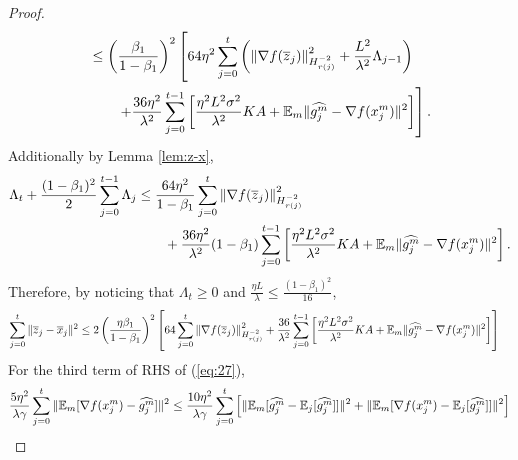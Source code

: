 \documentclass{article} %
\numberwithin{equation}{section}
\renewcommand{\eqref}[1]{(\ref{#1})}
\begin{document}
\begin{proof}
\begin{equation}
\begin{aligned}
            &\leq \left(\frac{\beta_1}{1-\beta_1}\right)^2 \left[64\eta^2\sum_{j=0}^t\left( \left\|\nabla f(\overline{z}_j)\right\|_{H_{r(j)}^{-2}}^2 + \frac{L^2}{\lambda^2}\Lambda_{j-1}\right) \right. \\
            &\qquad \left. + \frac{36\eta^2}{\lambda^2}\sum_{j=0}^{t-1} \left[\frac{\eta^2L^2\sigma^2}{\lambda^2}KA+\mathbb{E}_m\|\widehat{g_j^m}-\nabla f(x_j^m)\|^2\right]\right].
        \end{aligned}
    \end{equation}
    Additionally by Lemma \ref{lem:z-x},
    \begin{equation}
        \begin{aligned}
            \Lambda_t + \frac{(1-\beta_1)^2}{2}\sum_{j=0}^{t-1}\Lambda_j 
            &\leq \frac{64\eta^2}{1-\beta_1}\sum_{j=0}^t\left\|\nabla f(\overline{z}_j)\right\|_{H_{r(j)}^{-2}}^2 \\
            &\qquad + \frac{36\eta^2}{\lambda^2}(1-\beta_1)\sum_{j=0}^{t-1} \left[\frac{\eta^2L^2\sigma^2}{\lambda^2}KA+\mathbb{E}_m\|\widehat{g_j^m}-\nabla f(x_j^m)\|^2\right].
        \end{aligned}
    \end{equation}
    Therefore, by noticing that $\Lambda_t\geq 0$ and $\frac{\eta L}{\lambda}\leq \frac{(1-\beta_1)^2}{16}$,
    \begin{equation}\label{eq:30}
        \begin{aligned}
            \sum_{j=0}^t\|\overline{z}_j-\overline{x}_j\|^2 
            &\leq 2\left(\frac{\eta\beta_1}{1-\beta_1}\right)^2\left[64\sum_{j=0}^t\left\|\nabla f(\overline{z}_j)\right\|_{H_{r(j)}^{-2}}^2+\frac{36}{\lambda^2}\sum_{j=0}^{t-1} \left[\frac{\eta^2L^2\sigma^2}{\lambda^2}KA+\mathbb{E}_m\|\widehat{g_j^m}-\nabla f(x_j^m)\|^2\right]\right] 
        \end{aligned}
    \end{equation}
    For the third term of RHS of \eqref{eq:27},
    \begin{equation}\label{eq:31}
        \begin{aligned}
            \frac{5\eta^2}{\lambda\gamma} \sum_{j=0}^t\|\expect_m[\nabla f(x_j^m)-\widehat{g_j^m}]\|^2
            &\leq \frac{10\eta^2}{\lambda\gamma} \sum_{j=0}^t\left[\|\expect_m[\widehat{g_j^m}-\expect_j[\widehat{g_j^m}]]\|^2+\|\expect_m[\nabla f(x_j^m)-\expect_j[\widehat{g_j^m}]]\|^2\right] \\

\end{aligned}
\end{equation}
\end{proof}
\end{document}
